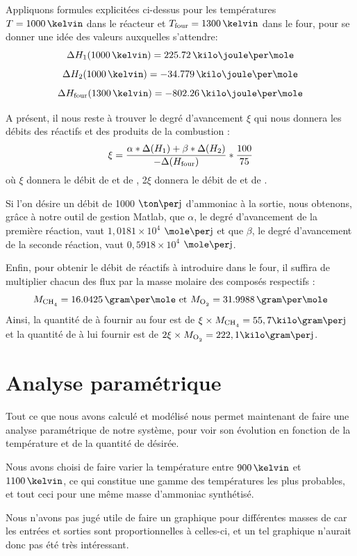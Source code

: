 \documentclass[a4paper,12pt]{article}
\begin{document}
Appliquons formules explicitées ci-dessus pour les températures $T=1000\,\kelvin$
dans le réacteur et $T\ind{four} = 1300\,\kelvin$ dans le four,
pour se donner une idée des valeurs auxquelles s'attendre:
$$\Delta H_1 (1000\,\kelvin) = 225.72\,\kilo\joule\per\mole$$
$$\Delta H_2 (1000\,\kelvin) = -34.779\,\kilo\joule\per\mole$$
$$\Delta H\ind{four} (1300\,\kelvin) = -802.26\,\kilo\joule\per\mole$$

A présent, il nous reste à trouver le degré d'avancement $\xi$
qui nous donnera les débits des réactifs et des produits de la combustion :
$$\xi = \frac{\alpha * \Delta (H_1) + \beta * \Delta (H_2)}{-\Delta (H_{\mbox{\scriptsize{four}}})}*\frac{100}{75}$$
où $\xi$ donnera le débit de  et de ,
2$\xi$ donnera le débit de  et de .

Si l'on désire un débit de 1000 $\ton\per\jour$ d'ammoniac à la sortie,  nous obtenons, grâce à notre outil de gestion Matlab, que  $\alpha$, le degré d'avancement de la première réaction, vaut $1,0181\times10^4$ $\mole\per\jour$ et que $\beta$, le degré d'avancement de la seconde réaction, vaut $0,5918\times10^4$ $\mole\per\jour$.

Enfin, pour obtenir le débit de réactifs à introduire dans le four,
il suffira de multiplier chacun des flux par la masse molaire des composés respectifs :
\begin{equation*}
M_{\ce{CH4}}=16.0425\,\gram\per\mole \mbox{ et } M_{\ce{O2}}=31.9988\,\gram\per\mole
\end{equation*}
Ainsi, la quantité de  à fournir au four est de $\xi \times M_{\ce{CH4}} = 55,7  \kilo\gram\per\jour$
\\et la quantité de  à lui fournir est de $2\xi \times M_{\ce{O2}} = 222,1 \kilo\gram\per\jour$.

\section{Analyse paramétrique}

Tout ce que nous avons calculé et modélisé nous permet maintenant de faire une analyse paramétrique de notre système, pour voir son évolution en fonction de la température et de la quantité de  désirée.

Nous avons choisi de faire varier la température entre $900\,\kelvin$ et $1100\,\kelvin$, ce qui constitue une gamme des températures les plus probables, et tout ceci pour une même masse d'ammoniac synthétisé.

Nous n'avons pas jugé utile de faire un graphique pour différentes masses de  car les entrées et sorties sont proportionnelles à celles-ci, et un tel graphique n'aurait donc pas été très intéressant.
\end{document}

